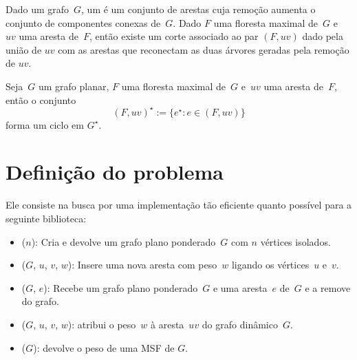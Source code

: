 Dado um grafo~$G$, um  é um conjunto de arestas cuja remoção aumenta o conjunto de componentes conexas de~$G$.
Dado $F$ uma floresta maximal de~$G$ e~$uv$ uma aresta de~$F$, então existe um corte associado ao par $(F, uv)$ dado pela união de $uv$ com as arestas que reconectam as duas árvores geradas pela remoção de $uv$.


\begin{theorem}
\label{teo:cutset}
Seja~$G$ um grafo planar, $F$ uma floresta maximal de~$G$ e~$uv$ uma aresta de~$F$, então o conjunto
$$
(F, uv)^\star := \{e^\star:e\in (F, uv)\}
$$
forma um ciclo em $G^\star$.
\end{theorem}


\section{Definição do problema}
\label{sec:definition-MSF}

Ele consiste na busca por uma implementação tão eficiente quanto possível para a seguinte biblioteca:

\begin{itemize}
\item \MSFCreate($n$): Cria e devolve um grafo plano ponderado~$G$ com $n$ vértices isolados.
\item \MSFaddEdge($G$, $u$, $v$, $w$): Insere uma nova aresta com peso~$w$ ligando os vértices~$u$ e~$v$.
\item \MSFdelEdge($G$, $e$): Recebe um grafo plano ponderado~$G$ e uma aresta~$e$ de~$G$ e a remove do grafo.
\item \MSFupdate($G$, $u$, $v$, $w$): atribui o peso~$w$ à aresta~$uv$ do grafo dinâmico~$G$.
\item \MSFweight($G$): devolve o peso de uma MSF de $G$.
\end{itemize}


